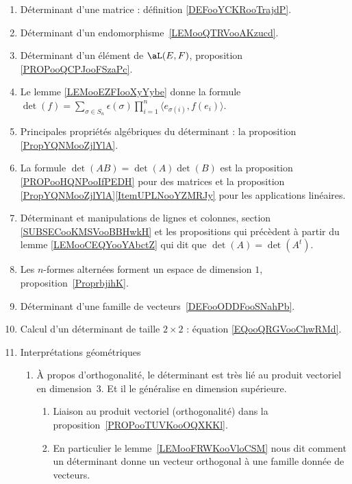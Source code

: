      \label{THMooUXJMooOroxbI}
\begin{enumerate}
	\item
	      Déterminant d'une matrice : définition \ref{DEFooYCKRooTrajdP}.
	\item
	      Déterminant d'un endomorphisme~\ref{LEMooQTRVooAKzucd}.
	\item
	      Déterminant d'un élément de \( \aL(E,F)\), proposition \ref{PROPooQCPJooFSzaPc}.
	\item
	      Le lemme \ref{LEMooEZFIooXyYybe} donne la formule \( \det(f)=\sum_{\sigma\in S_n}\epsilon(\sigma)\prod_{i=1}^n\langle e_{\sigma(i)}, f(e_i)\rangle\).
	\item
	      Principales propriétés algébriques du déterminant : la proposition \ref{PropYQNMooZjlYlA}.
	\item
	      La formule \( \det(AB)=\det(A)\det(B)\) est la proposition \ref{PROPooHQNPooIfPEDH} pour des matrices et la proposition \ref{PropYQNMooZjlYlA}\ref{ItemUPLNooYZMRJy} pour les applications linéaires.
	\item
	      Déterminant et manipulations de lignes et colonnes, section \ref{SUBSECooKMSVooBBHwkH} et les propositions qui précèdent à partir du lemme \ref{LEMooCEQYooYAbctZ} qui dit que \( \det(A)=\det(A^t)\).
	\item
	      Les \( n\)-formes alternées forment un espace de dimension \( 1\), proposition~\ref{ProprbjihK}.
	\item
	      Déterminant d'une famille de vecteurs~\ref{DEFooODDFooSNahPb}.
	\item
	      Calcul d'un déterminant de taille \( 2\times 2\) : équation \eqref{EQooQRGVooChwRMd}.
	\item
	      Interprétations géométriques
	      \begin{enumerate}
		      \item
		            À propos d'orthogonalité, le déterminant est très lié au produit vectoriel en dimension~\( 3\). Et il le généralise en dimension supérieure.
		            \begin{enumerate}
			            \item
			                  Liaison au produit vectoriel (orthogonalité) dans la proposition~\ref{PROPooTUVKooOQXKKl}.
			            \item
			                  En particulier le lemme~\ref{LEMooFRWKooVloCSM} nous dit comment un déterminant donne un vecteur orthogonal à une famille donnée de vecteurs.
		            \end{enumerate}

\end{enumerate}
\end{enumerate}
